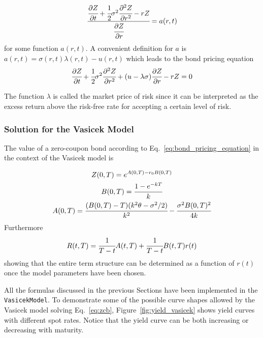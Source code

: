 \begin{equation*}
	\cfrac{\cfrac{\partial Z}{\partial t} + \cfrac{1}{2}\sigma^2 \cfrac{\partial^2 Z}{\partial r^2} - rZ}{\cfrac{\partial Z}{\partial r}}= a(r, t)
\end{equation*}
for some function $a(r, t)$. A convenient definition for $a$ is $a(r, t) = \sigma(r, t)\lambda(r, t)-u(r, t)$ which leads to the bond pricing equation
\begin{equation}
	\cfrac{\partial Z}{\partial t} + \cfrac{1}{2}\sigma^2 \cfrac{\partial^2 Z}{\partial r^2} + (u-\lambda\sigma)\cfrac{\partial Z}{\partial r}-rZ = 0
	\label{eq:bond_pricing_equation}
\end{equation}

The function $\lambda$ is called the market price of risk since it can be interpreted as the excess return above the risk-free rate for accepting a certain level of risk.

\subsubsection{Solution for the Vasicek Model}
\label{solution-for-the-vasicek-model}
The value of a zero-coupon bond according to Eq.~\ref{eq:bond_pricing_equation} in the context of the Vasicek model is

\begin{equation} 
	\begin{gathered}
		Z(0, T) = e^{A(0,T)-r_0 B(0,T)} \\
		B(0, T) = \cfrac{1-e^{-kT}}{k}\\
		A(0, T) = \cfrac{(B(0, T)-T)(k^2\theta - \sigma^2/2)}{k^2} - \cfrac{\sigma^2 B(0, T)^2}{4k}
		\label{eq:zcb_vasicek}
	\end{gathered}
\end{equation}
Furthermore
\begin{equation}
	R(t, T) = \cfrac{1}{T-t} A(t,T)+\cfrac{1}{T-t}B(t, T)r(t)
	\label{eq:term_structure_vasicek}
\end{equation}
showing that the entire term structure can be determined as a function of $r(t)$ once the model parameters have been chosen.

All the formulas discussed in the previous Sections have been implemented in the \texttt{VasicekModel}.
To demonstrate some of the possible curve shapes allowed by the Vasicek model solving Eq.~\ref{eq:zcb}, Figure~\ref{fig:yield_vasicek} shows yield curves with different spot rates. Notice that the yield curve can be both increasing or decreasing with maturity.

